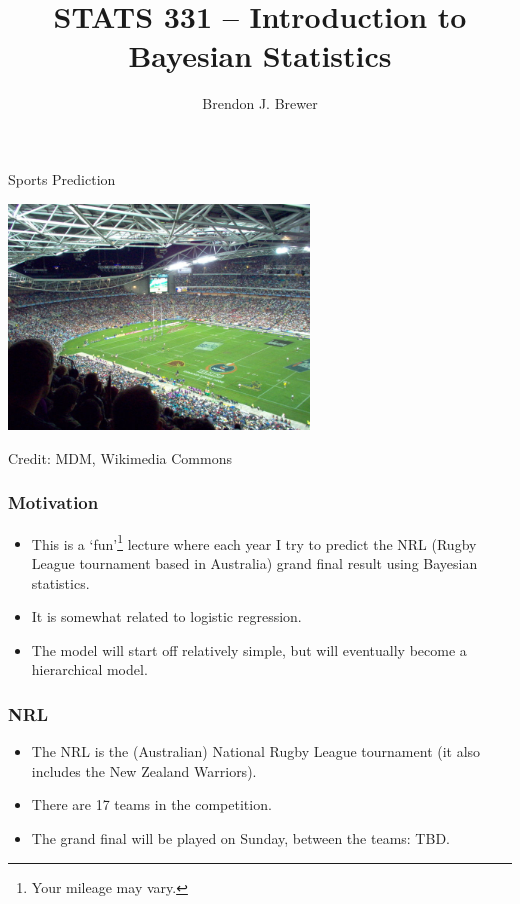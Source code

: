 \documentclass{beamer}
\author{Brendon J. Brewer}
\title{STATS 331 -- Introduction to Bayesian Statistics}
\institute{The University of Auckland}
\date{}
\begin{document}
\frame{\titlepage}

\begin{frame}
\centering
\Large
Sports Prediction

\begin{center}
\includegraphics[width=0.6\textwidth]{images/football.jpg}

Credit: MDM, Wikimedia Commons
\end{center}

\end{frame}


\begin{frame}
\frametitle{Motivation}

\begin{itemize}
\item This is a `fun'\footnote{Your mileage may vary.}
lecture where each year I try to predict the NRL
(Rugby League tournament based in Australia) grand final result using Bayesian
statistics. \pause
\item It is somewhat related to logistic regression.\pause
\item The model will start off relatively simple, but will eventually
become a hierarchical model.
\end{itemize}
\end{frame}

\begin{frame}
\frametitle{NRL}

\begin{itemize}
\item The NRL is the (Australian) National Rugby League tournament (it also
includes the New Zealand Warriors).\pause
\item There are 17 teams in the competition.\pause
\item The grand final will be played on Sunday, between the teams:
TBD.
\end{itemize}
\end{frame}
\end{document}
